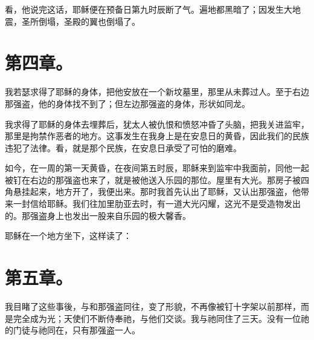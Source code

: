 看，他说完这话，耶稣便在预备日第九时辰断了气。遍地都黑暗了；因发生大地震，圣所倒塌，圣殿的翼也倒塌了。\par


\section{第四章。}

我若瑟求得了耶稣的身体，把他安放在一个新坟墓里，那里从未葬过人。至于右边那强盗，他的身体找不到了；但左边那强盗的身体，形状如同龙。\par

我求得了耶稣的身体去埋葬后，犹太人被仇恨和愤怒冲昏了头脑，把我关进监牢，那里是拘禁作恶者的地方。这事发生在我身上是在安息日的黄昏，因此我们的民族违犯了法律。看，就是那个民族，在安息日承受了可怕的磨难。\par

如今，在一周的第一天黄昏，在夜间第五时辰，耶稣来到监牢中我面前，同他一起被钉在右边的那强盗也来了，就是被他送入乐园的那位。屋里有大光。那房子被四角悬挂起来，地方开了，我便出来。那时我首先认出了耶稣，又认出那强盗，他带来一封信给耶稣。我们往加里肋亚去时，有一道大光闪耀，这光不是受造物发出的。那强盗身上也发出一股来自乐园的极大馨香。\par

耶稣在一个地方坐下，这样读了：\par


\section{第五章。}

我目睹了这些事後，与和那强盗同往，变了形貌，不再像被钉十字架以前那样，而是完全成为光；天使们不断侍奉祂，与他们交谈。我与祂同住了三天。没有一位祂的门徒与祂同在，只有那强盗一人。\par

